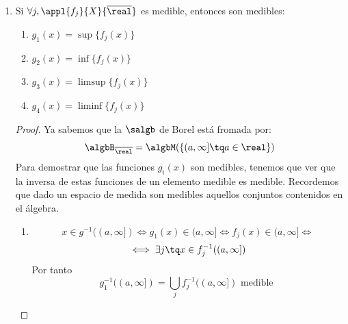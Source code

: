 \documentclass{apuntes}
\begin{document}
\begin{enumerate}
\begin{proof}
Si ahora componemos estas dos funciones obtenemos una función que sigue siendo medible y que a cada a cada $x$ le asocia $f(x)+g(x)$.

Lo mismo puede hacerse con el producto.
\end{proof}


\begin{defn}

Definimos $\overline{ℝ} = [-∞, +∞] = ℝ \cup \{+∞, -∞\}$, es decir consideramos en conjunto de los reales y le añadimos $\pm \infty$
\end{defn}

La $\salgb$ de Borel en $\overline{ℝ}$ ($\algbB_{\overline{ℝ}}$), está generada por:
\begin{enumerate}
\item $\{(a, +∞]: a ∈ ℝ\}$
\item $\{[-∞, a): a ∈ ℝ\}$
\end{enumerate}

\obs $\algbB_{ℝ} ⊆ \algbB_{\overline{ℝ}}$

La propiedad 7 la podemos extender a funciones $\appl{f}{X}{\overline{ℝ}}$, siempre que se defina de forma adecuada:
\[0 · (\pm∞) = 0\]
\[+∞ + (-∞) = 0\]


\item Si $\forall j, \appl{f_j}{X}{\overline{\real}}$ es medible, entonces son medibles:
\begin{enumerate}
\item $g_1(x)=\sup\{f_j(x)\}$
\item $g_2(x)=\inf\{f_j(x)\}$
\item $g_3(x)=\limsup\{f_j(x)\}$
\item $g_4(x)=\liminf\{f_j(x)\}$
\end{enumerate}

\begin{proof}
Ya sabemos que la $\salgb$ de Borel está fromada por:
\[\algbB_{\overline{\real}} = \algbM(\{(a, \infty] \tq a \in \real\})\]
Para demostrar que las funciones $g_i(x)$ son medibles, tenemos que ver que la inversa de estas funciones de un elemento medible es medible. Recordemos que dado un espacio de medida son medibles aquellos conjuntos contenidos en el álgebra.
\begin{enumerate}
\item
\[x \in g^{-1}((a, \infty]) \iff g_1(x) \in (a, \infty] \iff f_j(x) \in (a, \infty] \iff \]
\[\iff \exists j \tq x \in f^{-1}_j((a, \infty])\]
Por tanto
\[g^{-1}_1((a, \infty]) = \bigcup_j f^{-1}_j((a, \infty]) \text{ medible }\]


\end{enumerate}
\end{proof}
\end{enumerate}
\end{document}
